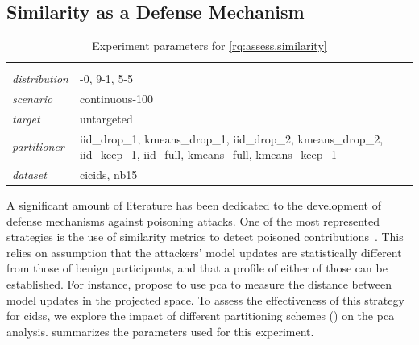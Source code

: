 \subsection{Similarity as a Defense Mechanism\label{sec:results.similarity}}

\begin{table}
  \caption{
    Experiment parameters for \ref{rq:assess.similarity}
    \label{tbl:assess.similarity}
  }
  \small
  \begin{tabular}{>{\ttfamily\itshape}p{} >{\ttfamily}p{}}
    \toprule
    \multicolumn{2}{>{\bfseries}p{.9\columnwidth}}{\rqsim} \\
    \midrule
    distribution & 10-0, 9-1, 5-5 \\
    scenario & continuous-100 \\
    target & untargeted \\
    partitioner & iid\_drop\_1, kmeans\_drop\_1, iid\_drop\_2, kmeans\_drop\_2, iid\_keep\_1, iid\_full, kmeans\_full, kmeans\_keep\_1 \\
    dataset & cicids, nb15 \\
    \bottomrule
  \end{tabular}
\end{table}

A significant amount of literature has been dedicated to the development of defense mechanisms against poisoning attacks.
One of the most represented strategies is the use of similarity metrics to detect poisoned contributions~\cite{fung_LimitationsFederatedLearning_2020,awan_CONTRADefendingPoisoning_2021,cao_FLTrustByzantinerobustFederated_2022,nguyen_FLAMETamingBackdoors_2022}.
This relies on assumption that the attackers' model updates are statistically different from those of benign participants, and that a profile of either of those can be established.
For instance, \textcite{tolpegin_DataPoisoningAttacks_2020} propose to use \gls{pca} to measure the distance between model updates in the projected space.
To assess the effectiveness of this strategy for \glspl{cids}, we explore the impact of different partitioning schemes (\cf {}) on the \gls{pca} analysis.
 summarizes the parameters used for this experiment.

